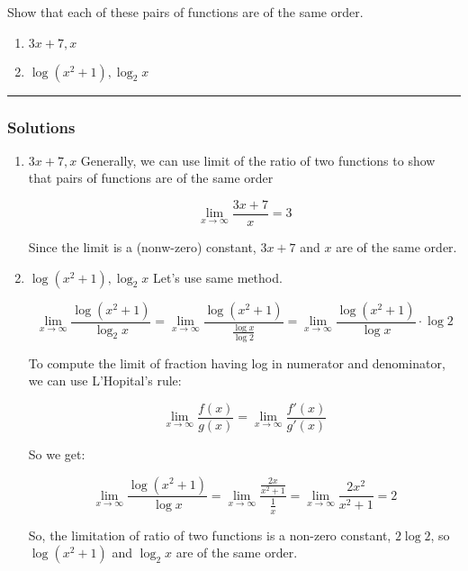 \newpage
\begin{question}
Show that each of these pairs of functions are of the same order.
\begin{enumerate}
    \item $3x+7, x$
    \item $\log (x^2+1), \log_2x$
\end{enumerate}
\end{question}

\par\noindent\rule{\textwidth}{0.5pt}

\subsubsection*{Solutions}
\begin{enumerate}
    \item $3x+7, x$
    Generally, we can use limit of the ratio of two functions to show that pairs of functions are of the same order

    $$\lim_{x \to \infty} \frac {3x + 7} x = 3$$

    Since the limit is a (nonw-zero) constant, $3x+7$ and $x$ are of the same order.

    \item $\log (x^2+1), \log_2x$
    Let's use same method.

    $$\lim_{x \to \infty} \frac {\log (x^2+1)} {\log_2x} = \lim_{x \to \infty} \frac {\log (x^2+1)} {\frac {\log x} {\log 2}} = \lim_{x \to \infty} \frac {\log (x^2+1)} {\log x} \cdot \log 2$$

    To compute the limit of fraction having log in numerator and denominator, we can use L'Hopital's rule:

    $$\lim_{x \to \infty} \frac {f(x)} {g(x)} = \lim_{x \to \infty} \frac {f'(x)} {g'(x)}$$

    So we get:

    $$\lim_{x \to \infty} \frac {\log (x^2+1)} {\log x} = \lim_{x \to \infty} \frac {\frac {2x} {x^2+1}} {\frac 1 x} = \lim_{x \to \infty} \frac {2x^2} {x^2+1} = 2$$

    So, the limitation of ratio of two functions is a non-zero constant, $2\log 2$, so $\log (x^2+1)$ and $\log_2x$ are of the same order.
\end{enumerate}